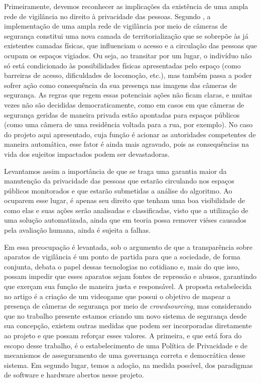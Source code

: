 \documentclass[]{politex}
\begin{document}
Primeiramente, devemos reconhecer as implicações da existência de uma ampla rede de vigilância no direito à privacidade das pessoas. Segundo \citeyear{firmino} \citeauthor{firmino}, a implementação de uma ampla rede de vigilância por meio de câmeras de segurança constitui uma nova camada de territorialização que se sobrepõe às já existentes camadas físicas, que influenciam o acesso e a circulação das pessoas que ocupam os espaços vigiados. Ou seja, ao transitar por um lugar, o indivíduo não só está condicionado às possibilidades físicas apresentadas pelo espaço (como barreiras de acesso, dificuldades de locomoção, etc.), mas também passa a poder sofrer ação como consequência da sua presença nas imagens das câmeras de segurança. As regras que regem essas potenciais ações não ficam claras, e muitas vezes não são decididas democraticamente, como em casos em que câmeras de segurança geridas de maneira privada estão apontadas para espaços públicos (como uma câmera de uma residência voltada para a rua, por exemplo). No caso do projeto aqui apresentado, cuja função é acionar as autoridades competentes de maneira automática, esse fator é ainda mais agravado, pois as consequências na vida dos sujeitos impactados podem ser devastadoras.

Levantamos assim a importância de que se traga uma garantia maior da manutenção da privacidade das pessoas que estarão circulando nos espaços públicos monitorados e que estarão submetidas a análise do algoritmo. Ao ocuparem esse lugar, é apenas seu direito que tenham uma boa visibilidade de como elas e suas ações serão analisadas e classificadas, visto que a utilização de uma solução automatizada, ainda que em teoria possa remover viéses causados pela avaliação humana, ainda é sujeita a falhas. 

Em \citeyear{dio} \citeauthor{dio} essa preocupação é levantada, sob o argumento de que a transparência sobre aparatos de vigilância é um ponto de partida para que a sociedade, de forma conjunta, debata o papel dessas tecnologias no cotidiano e, mais do que isso, possam impedir que esses aparatos sejam fontes de repressão e abusos, garantindo que exerçam sua função de maneira justa e responsável. A proposta estabelecida no artigo é a criação de um videogame que possui o objetivo de mapear a presença de câmeras de segurança por meio de \textit{crowdsourcing}, mas considerando que no trabalho presente estamos criando um novo sistema de segurança desde sua concepção, existem outras medidas que podem ser incorporadas diretamente ao projeto e que possam reforçar esses valores. A primeira, e que está fora do escopo desse trabalho, é o estabelecimento de uma Política de Privacidade e de mecanismos de asseguramento de uma governança correta e democrática desse sistema. Em segundo lugar, temos a adoção, na medida possível, dos paradigmas de software e hardware abertos nesse projeto.
\end{document}
